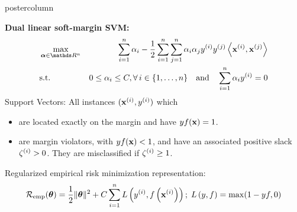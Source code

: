 \documentclass{beamer}
\begin{document}
\begin{frame}[fragile]{}
\begin{columns}
\begin{column}{.31\textwidth}
\begin{beamercolorbox}[center]{postercolumn}
\begin{minipage}{.98\textwidth}
{\begin{myblock}{}
%
	\textbf{Dual linear soft-margin SVM:} 	
%	
	\begin{eqnarray*}
		& \max\limits_{\alphav \in \R^n} & \sum_{i=1}^n \alpha_i - \frac{1}{2}\sum_{i=1}^n\sum_{j=1}^n\alpha_i\alpha_j\yi y^{(j)} \scp{\xi}{\xv^{(j)}} \\
		& \text{s.t. } & 0 \le \alpha_i \le C, \forall\, i \in \nset \quad \text{and} \quad  \sum_{i=1}^n \alpha_i \yi = 0
	\end{eqnarray*}
%
Support Vectors: All instances $(\mathbf{x}^{(i)}, y^{(i)})$ which 
% 
\begin{itemize}
	\setlength{\itemindent}{+.3in}
	\item are located exactly on the
	margin and have $yf(\mathbf{x})=1$.
	\item are margin violators, with $yf(\mathbf{x}) < 1$, and have an associated positive slack $\zeta^{(i)} > 0$. 
	They are misclassified if $\zeta^{(i)} \geq 1$.
\end{itemize}
%
Regularized empirical risk minimization representation:
%
$$ \mathcal{R}_{\text{emp}}(\bm{\theta}) = \frac{1}{2} \|\bm{\theta}\|^2 + C \sum\limits_{i=1}^n L\left(y^{(i)}, f\left(\mathbf{x}^{(i)}\right)\right) ;\; L\left(y, f\right) = \max(1-yf, 0)$$
%

\end{myblock}

}
\end{minipage}
\end{beamercolorbox}
\end{column}
\end{columns}
\end{frame}
\end{document}
